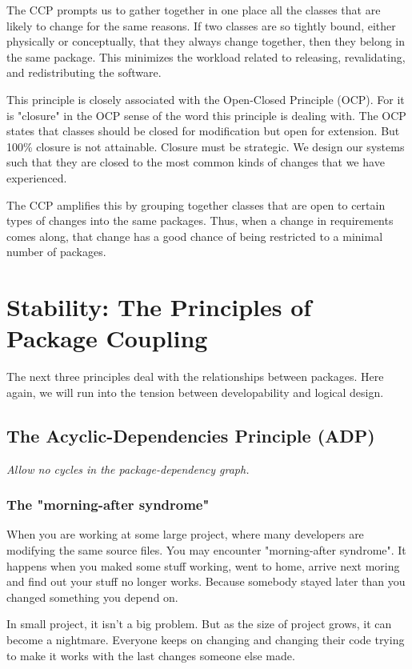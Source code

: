 \documentclass[12pt]{report}
\newcommand\tab[1][1cm]{\hspace*{#1}}
\begin{document}
The CCP prompts us to gather together in one place all the classes that are likely to change for the same 
reasons. If two classes are so tightly bound, either physically or conceptually, that they always change together, then
they belong in the same package. This minimizes the workload related to releasing, revalidating, and redistributing
the software.

This principle is closely associated with the Open-Closed Principle (OCP). 
For it is "closure" in the OCP sense of the word 
this principle is dealing with. 
The OCP states that classes should be closed for modification
but open for extension. But 100\% closure is not attainable. 
Closure must be strategic. We design our systems such that 
they are closed to the most common kinds of changes 
that we have experienced.

The CCP amplifies this by grouping together classes 
that are open to certain types of changes into the same packages. 
Thus, when a change in requirements comes along, 
that change has a good chance of being restricted to
a minimal number of packages.

\section{Stability: The Principles of Package Coupling}
The next three principles deal with the relationships between
packages. Here again, we will run into the tension between
developability and logical design.

\subsection{The Acyclic-Dependencies Principle (ADP)}

\tab\textit{Allow no cycles in the package-dependency graph.}

\subsubsection{The "morning-after syndrome"}
When you are working at some large project, where many developers are 
modifying the same source files. 
You may encounter "morning-after syndrome". 
It happens when you maked some stuff working, went to home, 
arrive next moring and find out your stuff no longer works.
Because somebody stayed later than you changed something you depend on.

In small project, it isn't a big problem. 
But as the size of project grows, it can become a nightmare.
Everyone keeps on changing  and changing their code trying to make it works 
with the last changes someone else made.
\end{document}
